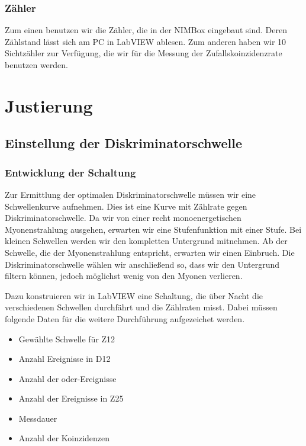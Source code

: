\documentclass[11pt, ngerman, fleqn, DIV=15, headinclude, BCOR=2cm]{scrreprt}
\begin{document}
\subsubsection{Zähler}

Zum einen benutzen wir die Zähler, die in der NIMBox eingebaut sind. Deren
Zählstand lässt sich am PC in LabVIEW ablesen. Zum anderen haben wir 10
Sichtzähler zur Verfügung, die wir für die Messung der Zufallskoinzidenzrate
benutzen werden.

\section{Justierung}

\subsection{Einstellung der Diskriminatorschwelle}
\label{sec:einstellung_diskriminatorschwelle}

\subsubsection{Entwicklung der Schaltung}

Zur Ermittlung der optimalen Diskriminatorschwelle müssen wir eine
Schwellenkurve aufnehmen. Dies ist eine Kurve mit Zählrate gegen
Diskriminatorschwelle. Da wir von einer recht monoenergetischen Myonenstrahlung
ausgehen, erwarten wir eine Stufenfunktion mit einer Stufe. Bei kleinen
Schwellen werden wir den kompletten Untergrund mitnehmen. Ab der Schwelle, die
der Myonenstrahlung entspricht, erwarten wir einen Einbruch. Die
Diskriminatorschwelle wählen wir anschließend so, dass wir den Untergrund
filtern können, jedoch möglichst wenig von den Myonen verlieren.

Dazu konstruieren wir in LabVIEW eine Schaltung, die über Nacht die
verschiedenen Schwellen durchfährt und die Zählraten misst. Dabei müssen
folgende Daten für die weitere Durchführung aufgezeichet werden.

\begin{itemize}
    \item
        Gewählte Schwelle für Z12

    \item
        Anzahl Ereignisse in D12

    \item
        Anzahl der oder-Ereignisse

    \item
        Anzahl der Ereignisse in Z25

    \item
        Messdauer

    \item
        Anzahl der Koinzidenzen
\end{itemize}
\end{document}
